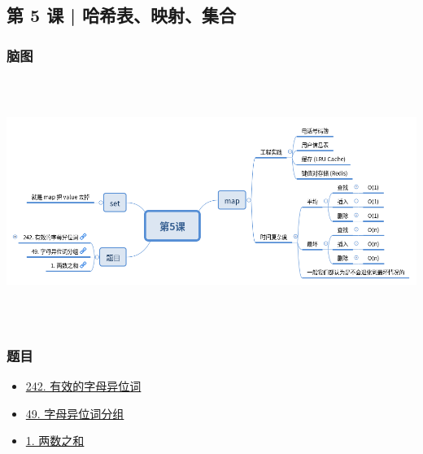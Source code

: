 \subsection{第 5 课 | 哈希表、映射、集合}

\subsubsection{脑图}

\includegraphics[width=170mm,height=80mm]{images/camp/第5课.png}

\subsubsection{题目}

\begin{itemize}
\item \hyperref[leetcode:242]{242. 有效的字母异位词}
\item \hyperref[leetcode:49]{49. 字母异位词分组}
\item \hyperref[leetcode:1]{1. 两数之和}
\end{itemize}
